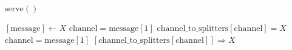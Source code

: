 \documentclass{article}
\begin{document}
\pagestyle{empty}

\newcommand{\send}{\Rightarrow}
\newcommand{\sendto}{\rightarrow}
\newcommand{\recv}{\Leftarrow}
\algrenewcommand\textproc{\textrm}

\begin{algorithmic}

  \algrenewcommand{}
  
  \State $\text{serve}()$
  \EndFunction
  
  \algrenewcommand{}
  \State $[\text{message}] \gets X$
  \State $\text{channel} = \text{message}[1]$
  \State $\text{channel\_to\_splitters}[\text{channel}]=X$
  \Else {}
  \State $\text{channel} = \text{message}[1]$
  \State $[\text{channel\_to\_splitters}[\text{channel}]] \send X$
  \EndIf
  \EndIf
  \EndWhile
  \EndProcedure

  \EndProcedure
\end{algorithmic}
\end{document}
